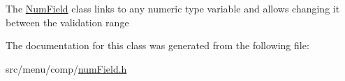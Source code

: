 The \hyperlink{classNumField}{Num\+Field} class links to any numeric type variable and allows changing it between the validation range 

The documentation for this class was generated from the following file\+:\begin{DoxyCompactItemize}
\item 
src/menu/comp/\hyperlink{numField_8h}{num\+Field.\+h}\end{DoxyCompactItemize}
